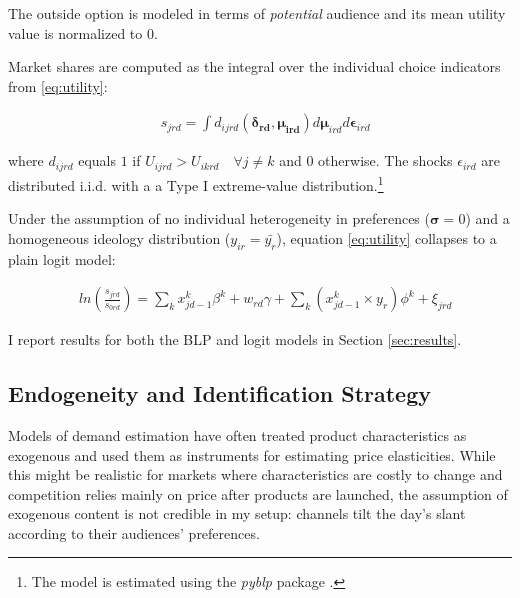 \documentclass[12pt]{article}
\begin{document}
	The outside option is modeled in terms of \textit{potential} audience  \citep{berry1994estimating} and its mean utility value is normalized to 0.
	
	Market shares are computed as the integral over the individual choice indicators from \ref{eq:utility}:  
	
	
	\begin{equation}\label{eq:shares}
	\begin{aligned}
		& s_{jrd} = \int d_{ijrd}(\bm{\delta_{rd}},\bm{\mu_{ird}})d\bm{\mu}_{ird}d\bm{\epsilon}_{ird}
	\end{aligned} 
\end{equation} 
	
	where $d_{ijrd}$ equals $1$ if $U_{ijrd}>U_{ikrd} \quad \forall j\neq k$ and $0$ otherwise. The shocks $\epsilon_{ird}$ are distributed i.i.d. with a a Type I extreme-value distribution.\footnote{The model is estimated using the \textit{pyblp} package \citep{conlon2020best}.} 

Under the assumption of no individual heterogeneity in preferences  ($\bm{\sigma}=0$) and a homogeneous ideology distribution ($y_{ir}= \bar{y_r}$),  equation \ref{eq:utility} collapses to a plain logit model: 


\begin{equation}\label{eq:logit}
	\begin{aligned}
		& ln \left(\frac{s_{jrd}}{s_{0rd}}\right)= \sum_k x_{jd-1}^k\beta^k+w_{rd}   \gamma  +\sum_k \left(x_{jd-1}^k\times y_r \right) \phi^k +  \xi_{jrd}
	\end{aligned} 
\end{equation} 


I report results for both the BLP and  logit models in  Section \ref{sec:results}. 
	
	\subsection{Endogeneity and Identification Strategy} \label{sec:endogeneity}
	\label{sec:identification}
	Models of demand estimation have often treated product characteristics as exogenous and used them as instruments for estimating price elasticities. While this might be realistic for  markets where characteristics are costly to change and competition relies mainly on price after products are launched, the assumption of exogenous content is not credible in my setup: channels  tilt the day's slant according to their audiences' preferences.
	
\end{document}
